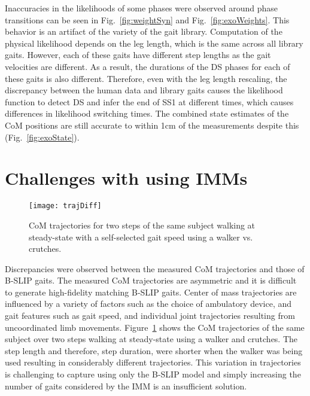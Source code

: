 Inaccuracies in the likelihoods of some phases were observed around phase transitions can be seen in Fig.~\ref{fig:weightSyn} and Fig.~\ref{fig:exoWeights}. This behavior is an artifact of the variety of the gait library. Computation of the physical likelihood depends on the leg length, which is the same across all library gaits. However, each of these gaits have different step lengths as the gait velocities are different. As a result, the durations of the DS phases for each of these gaits is also different. Therefore, even with the leg length rescaling, the discrepancy between the human data and library gaits causes the likelihood function to detect DS and infer the end of SS1 at different times, which causes differences in likelihood switching times. The combined state estimates of the CoM positions are still accurate to within 1cm of the measurements despite this (Fig.~\ref{fig:exoState}).

\section{Challenges with using IMMs}

\begin{figure}
	\centering
	\texttt{[image: trajDiff]}
	\caption{CoM trajectories for two steps of the same subject walking at steady-state with a self-selected gait speed using a walker vs. crutches.}\label{fig:trajDiff}
\end{figure}
Discrepancies were observed between the measured CoM trajectories and those of B-SLIP gaits. The measured CoM trajectories are asymmetric and it is difficult to generate high-fidelity matching B-SLIP gaits. Center of mass trajectories are influenced by a variety of factors such as the choice of ambulatory device, and gait features such as gait speed, and individual joint trajectories resulting from uncoordinated limb movements. Figure~\ref{fig:trajDiff} shows the CoM trajectories of the same subject over two steps walking at steady-state using a walker and crutches. The step length and therefore, step duration, were shorter when the walker was being used resulting in considerably different trajectories. This variation in trajectories is challenging to capture using only the B-SLIP model and simply increasing the number of gaits considered by the IMM is an insufficient solution.

